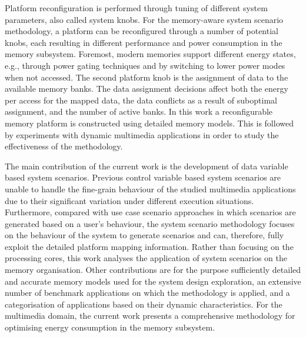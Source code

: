 Platform reconfiguration is performed through tuning of different system parameters, also called system knobs. For the memory-aware system scenario methodology, a platform can be reconfigured through a number of potential knobs, each resulting in different performance and power consumption in the memory subsystem. Foremost, modern memories support different energy states, e.g., through power gating techniques and by switching to lower power modes when not accessed. %
The second platform knob is the assignment of data to the available memory banks. The data assignment decisions affect both the energy per access for the mapped data, the data conflicts as a result of suboptimal assignment, and the number of active banks. In this work a reconfigurable memory platform is constructed using detailed memory models. This is followed by experiments with dynamic multimedia applications in order to study the effectiveness of the methodology.

The main contribution of the current work is the development of data variable based system scenarios. Previous control variable based system scenarios are unable to handle the fine-grain behaviour of the studied multimedia applications due to their significant variation under different execution situations. Furthermore, compared with use case scenario approaches in which scenarios are generated based on a user's behaviour, the system scenario methodology focuses on the behaviour of the system to generate scenarios and can, therefore, fully exploit the detailed platform mapping information. Rather than focusing on the processing cores, this work analyses the application of system scenarios on the memory organisation. Other contributions are for the purpose sufficiently detailed and accurate memory models used for the system design exploration, an extensive number of benchmark applications on which the methodology is applied, and a categorisation of applications based on their dynamic characteristics. For the multimedia domain, the current work presents a comprehensive methodology for optimising energy consumption in the memory subsystem.



